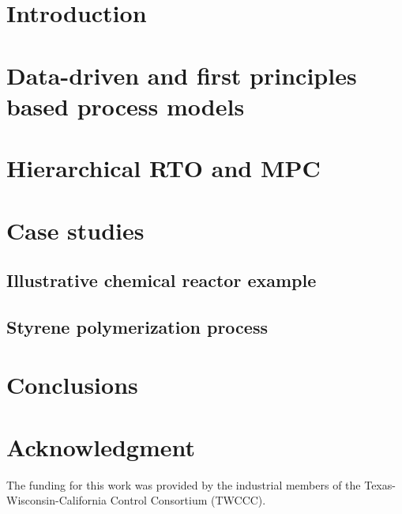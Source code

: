 \documentclass[preprint,5p, twocolumn, authoryear]{elsarticle}
\begin{document}
\section{Introduction} \label{sec:introduction}


\section{Data-driven and first principles based process models} 
\label{sec:process_models}

\section{Hierarchical RTO and MPC} 
\label{sec:rto_mpc}

\section{Case studies} \label{sec:case_study}

\subsection{Illustrative chemical reactor example}

\subsection{Styrene polymerization process}

\section{Conclusions} \label{sec:conclusions}


\section*{Acknowledgment}
The funding for this work was provided by the industrial members of the
Texas-Wisconsin-California Control Consortium (TWCCC). 



\end{document}
